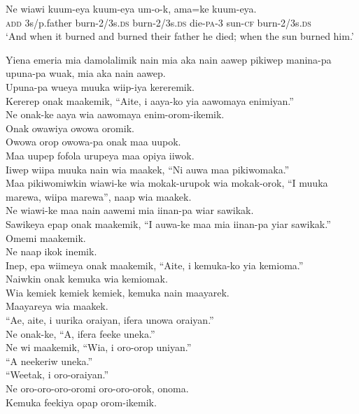 \ea\label{ex:a:x33}
\gll  Ne  wiawi  kuum-eya  kuum-eya  um-o-k,  ama=ke  kuum-eya. \\
\textsc{add}  3s/p.father  burn-2/3s.\textsc{ds}  burn-2/3s.\textsc{ds}  die-\textsc{pa}-3  sun-\textsc{cf}  burn-2/3s.\textsc{ds} \\
\glt ‘And when it burned and burned their father he died; when the sun burned him.’ \\
\z


Yiena emeria mia damolalimik nain mia aka nain aawep pikiwep manina-pa upuna-pa wuak, mia aka nain aawep. \\
Upuna-pa wueya muuka wiip-iya kereremik. \\
Kererep onak maakemik, “Aite, i aaya-ko yia aawomaya enimiyan.” \\
Ne onak-ke aaya wia aawomaya enim-orom-ikemik. \\
Onak owawiya owowa oromik. \\
Owowa orop owowa-pa onak maa uupok. \\
Maa uupep fofola urupeya maa opiya iiwok. \\
Iiwep wiipa muuka nain wia maakek, “Ni auwa maa pikiwomaka.” \\
Maa pikiwomiwkin wiawi-ke wia mokak-urupok wia mokak-orok,  “I muuka marewa, wiipa marewa”, naap wia maakek. \\
Ne wiawi-ke maa nain aawemi mia iinan-pa wiar sawikak. \\
Sawikeya epap onak maakemik, “I auwa-ke maa mia iinan-pa yiar sawikak.” \\
Omemi maakemik. \\
Ne naap ikok inemik. \\
Inep, epa wiimeya onak maakemik, “Aite, i kemuka-ko yia kemioma.” \\
Naiwkin onak kemuka wia kemiomak. \\
Wia kemiek kemiek kemiek, kemuka nain maayarek. \\
Maayareya wia maakek. \\
“Ae, aite, i uurika oraiyan, ifera unowa oraiyan.” \\
Ne onak-ke, “A, ifera feeke uneka.” \\
Ne wi maakemik, “Wia, i oro-orop uniyan.” \\
“A neekeriw uneka.” \\
“Weetak, i oro-oraiyan.” \\
Ne oro-oro-oro-oromi oro-oro-orok, onoma. \\
Kemuka feekiya opap orom-ikemik. \\
